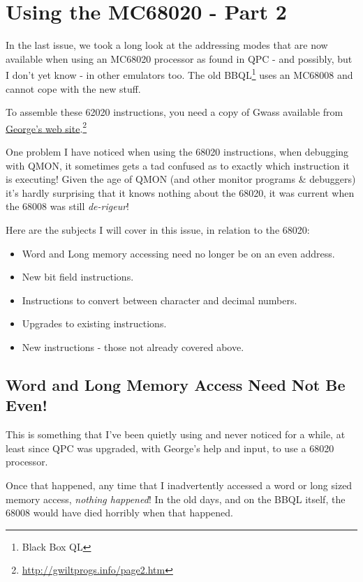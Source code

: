 \chapter{Using the MC68020 - Part 2}

In the last issue, we took a long look at the addressing modes that are now available when using an MC68020 processor as found in QPC - and possibly, but I don't yet know - in other emulators too. The old BBQL\footnote{Black Box QL} uses an MC68008 and cannot cope with the new stuff.

To assemble these 62020 instructions, you need a copy of Gwass available from \href{http://gwiltprogs.info/page2.htm}{George's web site}.\footnote{\url{http://gwiltprogs.info/page2.htm}}

One problem I have noticed when using the 68020 instructions, when debugging with QMON, it sometimes gets a tad confused as to exactly which instruction it is executing! Given the age of QMON (and other monitor programs \& debuggers) it's hardly surprising that it knows nothing about the 68020, it was current when the 68008 was still \emph{de-rigeur}!

Here are the subjects I will cover in this issue, in relation to the 68020:

\begin{itemize}
	\item Word and Long memory accessing need no longer be on an even address.
	\item New bit field instructions.
	\item Instructions to convert between character and decimal numbers.
	\item Upgrades to existing instructions.
	\item New instructions - those not already covered above.
\end{itemize}

\section{Word and Long Memory Access Need Not Be Even!}

This is something that I've been quietly using and never noticed for a while, at least since QPC was upgraded, with George's help and input, to use a 68020 processor.

Once that happened, any time that I inadvertently accessed a word or long sized memory access, \emph{nothing happened}! In the old days, and on the BBQL itself, the 68008 would have died horribly when that happened.

